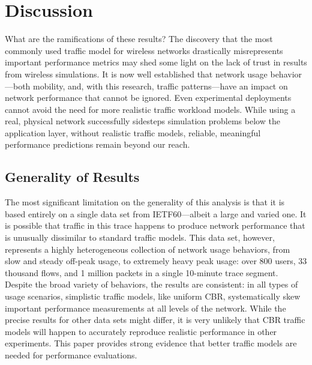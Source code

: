 \documentclass[conference]{IEEEtran}
\newcommand{\caps}[1]{{\small{#1}}}
\begin{document}
\section{Discussion}\label{sec:discussion}

What are the ramifications of these results? The discovery that the most commonly used traffic model for wireless networks drastically misrepresents important performance metrics may shed some light on the lack of trust in results from wireless simulations. It is now well established that network usage behavior---both mobility, and, with this research, traffic patterns---have an impact on network performance that cannot be ignored. Even experimental deployments cannot avoid the need for more realistic traffic workload models. While using a real, physical network successfully sidesteps simulation problems below the application layer, without realistic traffic models, reliable, meaningful performance predictions remain beyond our reach.

\subsection{Generality of Results}


The most significant limitation on the generality of this analysis is that it is based entirely on a single data set from \caps{IETF}60---albeit a large and varied one. It is possible that traffic in this trace happens to produce network performance that is unusually dissimilar to standard traffic models. This data set, however, represents a highly heterogeneous collection of network usage behaviors, from slow and steady off-peak usage, to extremely heavy peak usage: over 800 users, 33 thousand flows, and 1 million packets in a single 10-minute trace segment. Despite the broad variety of behaviors, the results are consistent: in all types of usage scenarios, simplistic traffic models, like uniform \caps{CBR}, systematically skew important performance measurements at all levels of the network. While the precise results for other data sets might differ, it is very unlikely that \caps{CBR} traffic models will happen to accurately reproduce realistic performance in other experiments. This paper provides strong evidence that better traffic models are needed for performance evaluations.
\end{document}
